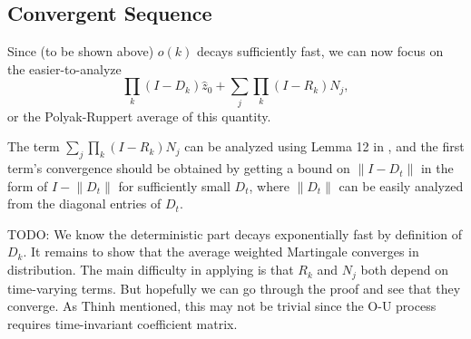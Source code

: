 \subsection{Convergent Sequence}
Since {\color{red}(to be shown above)} $o(k)$ decays sufficiently fast, we can now focus on the easier-to-analyze
\begin{equation}
    \prod_k (I - D_k) \hat{z}_0 + \sum_j \prod_k (I - R_k) N_j ,
\end{equation}
or the Polyak-Ruppert average of this quantity.


The term $\sum_j \prod_k (I - R_k) N_j$ can be analyzed using Lemma 12 in \citep{kaledin2020finite}, and the first term's convergence should be obtained by getting a bound on $\lVert I - D_t\rVert$ in the form of $I - \lVert D_t \rVert$ for sufficiently small $D_t$, where $\lVert D_t\rVert$ can be easily analyzed from the diagonal entries of $D_t$.

{\color{blue}TODO: We know the deterministic part decays exponentially fast by definition of $D_k$.
It remains to show that the average weighted Martingale converges in distribution.
The main difficulty in applying \citep{srikant2024CLT} is that $R_k$ and $N_j$ both depend on time-varying terms. 
But hopefully we can go through the proof and see that they converge. 
As Thinh mentioned, this may not be trivial since the O-U process requires time-invariant coefficient matrix. 
}


